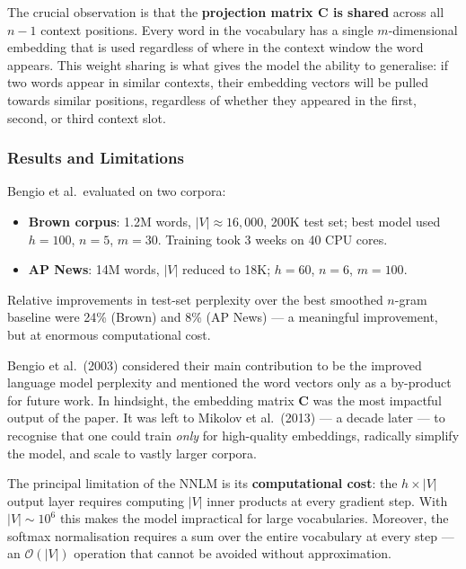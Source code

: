 \documentclass[11pt,a4paper]{article}
\begin{document}
The crucial observation is that the \textbf{projection matrix $\mathbf{C}$ is shared} across all $n-1$ context positions. Every word in the vocabulary has a single $m$-dimensional embedding that is used regardless of where in the context window the word appears. This weight sharing is what gives the model the ability to generalise: if two words appear in similar contexts, their embedding vectors will be pulled towards similar positions, regardless of whether they appeared in the first, second, or third context slot.

\subsubsection{Results and Limitations}

Bengio et al.\ evaluated on two corpora:
\begin{itemize}
  \item \textbf{Brown corpus}: 1.2M words, $|V| \approx 16{,}000$, 200K test set; best model used $h=100$, $n=5$, $m=30$. Training took 3 weeks on 40 CPU cores.
  \item \textbf{AP News}: 14M words, $|V|$ reduced to 18K; $h=60$, $n=6$, $m=100$.
\end{itemize}

Relative improvements in test-set perplexity over the best smoothed $n$-gram baseline were 24\% (Brown) and 8\% (AP News) — a meaningful improvement, but at enormous computational cost.

\begin{insightbox}
Bengio et al.\ (2003) considered their main contribution to be the improved language model perplexity and mentioned the word vectors only as a by-product for future work. In hindsight, the embedding matrix $\mathbf{C}$ was the most impactful output of the paper. It was left to Mikolov et al.\ (2013) — a decade later — to recognise that one could train \emph{only} for high-quality embeddings, radically simplify the model, and scale to vastly larger corpora.
\end{insightbox}

The principal limitation of the NNLM is its \textbf{computational cost}: the $h \times |V|$ output layer requires computing $|V|$ inner products at every gradient step. With $|V| \sim 10^6$ this makes the model impractical for large vocabularies. Moreover, the softmax normalisation requires a sum over the entire vocabulary at every step — an $\mathcal{O}(|V|)$ operation that cannot be avoided without approximation.
\end{document}
